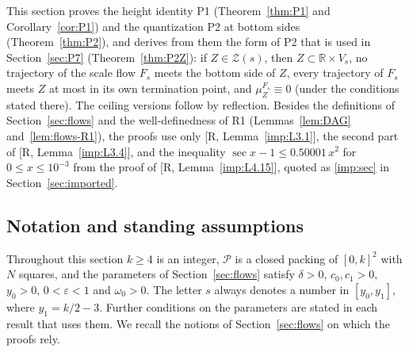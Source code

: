 \documentclass[11pt]{amsart}
\newcommand{\R}{\mathbb R}
\newcommand{\eps}{\varepsilon}
\newcommand{\cP}{\mathcal P}
\newcommand{\cZ}{\mathcal Z}
\newcommand{\Fs}{F_{s}}
\theoremstyle{definition}
\theoremstyle{remark}
\numberwithin{equation}{section}
\begin{document}
This section proves the height identity P1 (Theorem~\ref{thm:P1} and Corollary~\ref{cor:P1}) and the quantization P2 at bottom sides (Theorem~\ref{thm:P2}), and derives from them the form of P2 that is used in Section~\ref{sec:P7} (Theorem~\ref{thm:P2Z}): if $Z\in\cZ(s)$, then $Z\subset\R\times V_s$, no trajectory of the scale flow $\Fs$ meets the bottom side of $Z$, every trajectory of $\Fs$ meets $Z$ at most in its own termination point, and $\mu^{\Fs}_Z\equiv0$ (under the conditions stated there). The ceiling versions follow by reflection. Besides the definitions of Section~\ref{sec:flows} and the well-definedness of R1 (Lemmas~\ref{lem:DAG} and~\ref{lem:flows-R1}), the proofs use only [R, Lemma~\ref{imp:L3.1}], the second part of [R, Lemma~\ref{imp:L3.4}], and the inequality $\sec x-1\le0.50001\,x^2$ for $0\le x\le10^{-3}$ from the proof of [R, Lemma~\ref{imp:L4.15}], quoted as \eqref{imp:sec} in Section~\ref{sec:imported}.

\subsection{Notation and standing assumptions}\label{ssec:P12-notation}

Throughout this section $k\ge4$ is an integer, $\cP$ is a closed packing of $[0,k]^2$ with $N$ squares, and the parameters of Section~\ref{sec:flows} satisfy $\delta>0$, $c_0,c_1>0$, $y_0>0$, $0<\eps<1$ and $\omega_0>0$. The letter $s$ always denotes a number in $[y_0,y_1]$, where $y_1=k/2-3$. Further conditions on the parameters are stated in each result that uses them. We recall the notions of Section~\ref{sec:flows} on which the proofs rely.
\end{document}
